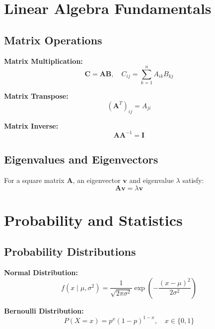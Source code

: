 \section{Linear Algebra Fundamentals}

\subsection{Matrix Operations}

\textbf{Matrix Multiplication:}
\begin{equation}
\mathbf{C} = \mathbf{A}\mathbf{B}, \quad C_{ij} = \sum_{k=1}^{n} A_{ik}B_{kj}
\end{equation}

\textbf{Matrix Transpose:}
\begin{equation}
(\mathbf{A}^T)_{ij} = A_{ji}
\end{equation}

\textbf{Matrix Inverse:}
\begin{equation}
\mathbf{A}\mathbf{A}^{-1} = \mathbf{I}
\end{equation}

\subsection{Eigenvalues and Eigenvectors}

For a square matrix $\mathbf{A}$, an eigenvector $\mathbf{v}$ and eigenvalue $\lambda$ satisfy:
\begin{equation}
\mathbf{A}\mathbf{v} = \lambda\mathbf{v}
\end{equation}

\section{Probability and Statistics}

\subsection{Probability Distributions}

\textbf{Normal Distribution:}
\begin{equation}
f(x \mid \mu, \sigma^2) = \frac{1}{\sqrt{2\pi\sigma^2}} \exp\left(-\frac{(x-\mu)^2}{2\sigma^2}\right)
\end{equation}

\textbf{Bernoulli Distribution:}
\begin{equation}
P(X=x) = p^x(1-p)^{1-x}, \quad x \in \{0,1\}
\end{equation}


